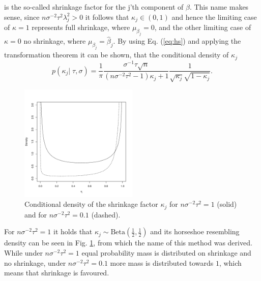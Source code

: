 \documentclass[12pt,letterpaper]{article}
\numberwithin{equation}{subsection}
\begin{document}
is the so-called shrinkage factor for the j'th component of $\beta$. This name makes sense, since $n\sigma^{-2}\tau^2\lambda^2_j > 0$ it follows that $\kappa_j \in (0,1)$ and hence the limiting case of $\kappa = 1$ represents full shrinkage, where $\mu_{\beta_j} = 0$, and the other limiting case of $\kappa = 0$ no shrinkage, where $\mu_{\beta_j} = \hat{\beta}_j$.
By using Eq. (\ref{eq:hs}) and applying the transformation theorem it can be shown, that the conditional density of $\kappa_j$
\begin{equation}
p(\kappa_j|\;\tau,\sigma) = \frac{1}{\pi}\frac{\sigma^{-1}\tau\sqrt{n}}{(n\sigma^{-2}\tau^2 - 1)\kappa_j + 1}\frac{1}{\sqrt{\kappa_j}\sqrt{1-\kappa_j}}. 
\label{eq:kappa}
\end{equation}
\begin{figure}[bt!]
 \centering
 \includegraphics[width=0.5\textwidth]{../plots/kappa.pdf}
 \caption[Conditional density of the shrinkage factor $\kappa_j$]{Conditional density of the shrinkage factor $\kappa_j$ for $n\sigma^{-2}\tau^2 = 1$ (solid) and 
 for $n\sigma^{-2}\tau^2 = 0.1$ (dashed).}
 \label{fig:hs}
\end{figure}
For $n\sigma^{-2}\tau^2 = 1$ it holds that $\kappa_j \sim \text{Beta}(\frac{1}{2},\frac{1}{2})$ and its horseshoe resembling density can be seen in Fig. \ref{fig:hs}, from which the name of this method was derived. While under $n\sigma^{-2}\tau^2 = 1$ equal probability mass is distributed on shrinkage and no shrinkage, under  $n\sigma^{-2}\tau^2 = 0.1$ more mass is distributed towards $1$, which means that shrinkage is favoured.
\end{document}
